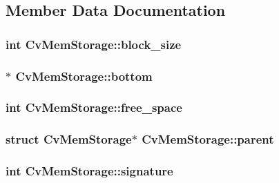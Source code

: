 \subsection{Member Data Documentation}
\hypertarget{structCvMemStorage_ac9b161be5f7c94fd6bd2515df0ea70f0}{
\subsubsection[{block\-\_\-size}]{\setlength{\rightskip}{0pt plus 5cm}int Cv\-Mem\-Storage\-::block\-\_\-size}}\label{structCvMemStorage_ac9b161be5f7c94fd6bd2515df0ea70f0}
\hypertarget{structCvMemStorage_a2cdac5680dfa6687e53d3e694a328d61}{
\subsubsection[{bottom}]{$\ast$ Cv\-Mem\-Storage\-::bottom}}\label{structCvMemStorage_a2cdac5680dfa6687e53d3e694a328d61}
\hypertarget{structCvMemStorage_a67a2a5803a0eed924d3d0f3dc91fe811}{
\subsubsection[{free\-\_\-space}]{\setlength{\rightskip}{0pt plus 5cm}int Cv\-Mem\-Storage\-::free\-\_\-space}}\label{structCvMemStorage_a67a2a5803a0eed924d3d0f3dc91fe811}
\hypertarget{structCvMemStorage_a42c4f6ed6f03bdda8fd46a9edc3ae13a}{
\subsubsection[{parent}]{\setlength{\rightskip}{0pt plus 5cm}struct {\bf Cv\-Mem\-Storage}$\ast$ Cv\-Mem\-Storage\-::parent}}\label{structCvMemStorage_a42c4f6ed6f03bdda8fd46a9edc3ae13a}
\hypertarget{structCvMemStorage_ad6cff87c874de298f27b1f7599795cdd}{
\subsubsection[{signature}]{\setlength{\rightskip}{0pt plus 5cm}int Cv\-Mem\-Storage\-::signature}}\label{structCvMemStorage_ad6cff87c874de298f27b1f7599795cdd}
